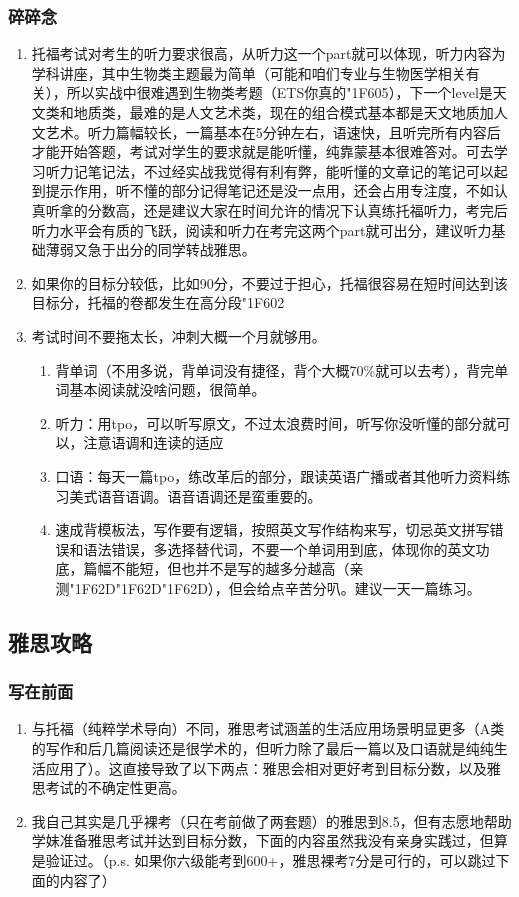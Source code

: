 \documentclass[zihao=-4,fontset=none]{Beautybook-CN}
\begin{document}
\subsubsection{碎碎念}
\begin{enumerate}
\item 托福考试对考生的听力要求很高，从听力这一个part就可以体现，听力内容为学科讲座，其中生物类主题最为简单（可能和咱们专业与生物医学相关有关），所以实战中很难遇到生物类考题（ETS你真的{\char"1F605}），下一个level是天文类和地质类，最难的是人文艺术类，现在的组合模式基本都是天文地质加人文艺术。听力篇幅较长，一篇基本在5分钟左右，语速快，且听完所有内容后才能开始答题，考试对学生的要求就是能听懂，纯靠蒙基本很难答对。可去学习听力记笔记法，不过经实战我觉得有利有弊，能听懂的文章记的笔记可以起到提示作用，听不懂的部分记得笔记还是没一点用，还会占用专注度，不如认真听拿的分数高，还是建议大家在时间允许的情况下认真练托福听力，考完后听力水平会有质的飞跃，阅读和听力在考完这两个part就可出分，建议听力基础薄弱又急于出分的同学转战雅思。
\item 如果你的目标分较低，比如90分，不要过于担心，托福很容易在短时间达到该目标分，托福的卷都发生在高分段{\char"1F602}

\item 考试时间不要拖太长，冲刺大概一个月就够用。
\begin{enumerate}
\item 背单词（不用多说，背单词没有捷径，背个大概70\%就可以去考），背完单词基本阅读就没啥问题，很简单。
\item 听力：用tpo，可以听写原文，不过太浪费时间，听写你没听懂的部分就可以，注意语调和连读的适应
\item 口语：每天一篇tpo，练改革后的部分，跟读英语广播或者其他听力资料练习美式语音语调。语音语调还是蛮重要的。
\item 速成背模板法，写作要有逻辑，按照英文写作结构来写，切忌英文拼写错误和语法错误，多选择替代词，不要一个单词用到底，体现你的英文功底，篇幅不能短，但也并不是写的越多分越高（亲测{\char"1F62D}{\char"1F62D}{\char"1F62D}），但会给点辛苦分叭。建议一天一篇练习。
\end{enumerate}
\end{enumerate}
\subsection{雅思攻略}

\subsubsection{写在前面}
\begin{enumerate}
\item 与托福（纯粹学术导向）不同，雅思考试涵盖的生活应用场景明显更多（A类的写作和后几篇阅读还是很学术的，但听力除了最后一篇以及口语就是纯纯生活应用了）。这直接导致了以下两点：雅思会相对更好考到目标分数，以及雅思考试的不确定性更高。
\item 我自己其实是几乎裸考（只在考前做了两套题）的雅思到8.5，但有志愿地帮助学妹准备雅思考试并达到目标分数，下面的内容虽然我没有亲身实践过，但算是验证过。（p.s. 如果你六级能考到600+，雅思裸考7分是可行的，可以跳过下面的内容了）
\end{enumerate}
\end{document}
